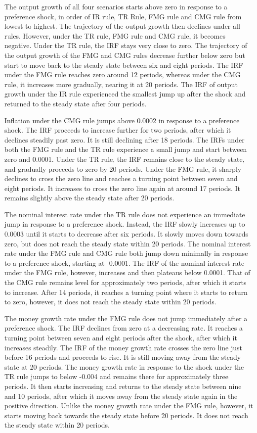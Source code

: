 \documentclass[11pt,preprint, authoryear]{elsarticle}
\numberwithin{equation}{section}
\numberwithin{figure}{section}
\numberwithin{table}{section}
\begin{document}
The output growth of all four scenarios starts above zero in response to
a preference shock, in order of IR rule, TR Rule, FMG rule and CMG rule
from lowest to highest. The trajectory of the output growth then
declines under all rules. However, under the TR rule, FMG rule and CMG
rule, it becomes negative. Under the TR rule, the IRF stays very close
to zero. The trajectory of the output growth of the FMG and CMG rules
decrease further below zero but start to move back to the steady state
between six and eight periods. The IRF under the FMG rule reaches zero
around 12 periods, whereas under the CMG rule, it increases more
gradually, nearing it at 20 periods. The IRF of output growth under the
IR rule experienced the smallest jump up after the shock and returned to
the steady state after four periods.

Inflation under the CMG rule jumps above 0.0002 in response to a
preference shock. The IRF proceeds to increase further for two periods,
after which it declines steadily past zero. It is still declining after
18 periods. The IRFs under both the FMG rule and the TR rule experience
a small jump and start between zero and 0.0001. Under the TR rule, the
IRF remains close to the steady state, and gradually proceeds to zero by
20 periods. Under the FMG rule, it sharply declines to cross the zero
line and reaches a turning point between seven and eight periods. It
increases to cross the zero line again at around 17 periods. It remains
slightly above the steady state after 20 periods.

The nominal interest rate under the TR rule does not experience an
immediate jump in response to a preference shock. Instead, the IRF
slowly increases up to 0.0003 until it starts to decrease after six
periods. It slowly moves down towards zero, but does not reach the
steady state within 20 periods. The nominal interest rate under the FMG
rule and CMG rule both jump down minimally in response to a preference
shock, starting at -0.0001. The IRF of the nominal interest rate under
the FMG rule, however, increases and then plateaus below 0.0001. That of
the CMG rule remains level for approximately two periods, after which it
starts to increase. After 14 periods, it reaches a turning point where
it starts to return to zero, however, it does not reach the steady state
within 20 periods.

The money growth rate under the FMG rule does not jump immediately after
a preference shock. The IRF declines from zero at a decreasing rate. It
reaches a turning point between seven and eight periods after the shock,
after which it increases steadily. The IRF of the money growth rate
crosses the zero line just before 16 periods and proceeds to rise. It is
still moving away from the steady state at 20 periods. The money growth
rate in response to the shock under the TR rule jumps to below -0.004
and remains there for approximately three periods. It then starts
increasing and returns to the steady state between nine and 10 periods,
after which it moves away from the steady state again in the positive
direction. Unlike the money growth rate under the FMG rule, however, it
starts moving back towards the steady state before 20 periods. It does
not reach the steady state within 20 periods.
\end{document}
